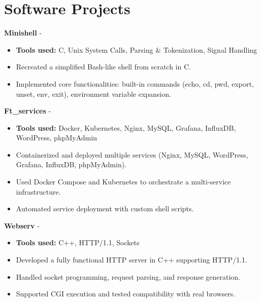 \documentclass[a4paper,11pt]{article}%
\begin{document}
\section*{Software Projects}%
%
\noindent \textbf{Minishell} - \href{https://github.com/sboof911/minishell}{{}}%
\begin{itemize}[leftmargin=2em,label={},parsep=0pt,topsep=1em]%
\item \textbf{Tools used:} C, Unix System Calls, Parsing \& Tokenization, Signal Handling%
\item Recreated a simplified Bash-like shell from scratch in C.%
\item Implemented core functionalities: built-in commands (echo, cd, pwd, export, unset, env, exit), environment variable expansion.%
\end{itemize}%
%
\noindent \textbf{Ft\_services} - \href{https://github.com/sboof911/ft_services}{{}}%
\begin{itemize}[leftmargin=2em,label={},parsep=0pt,topsep=1em]%
\item \textbf{Tools used:} Docker, Kubernetes, Nginx, MySQL, Grafana, InfluxDB, WordPress, phpMyAdmin%
\item Containerized and deployed multiple services (Nginx, MySQL, WordPress, Grafana, InfluxDB, phpMyAdmin).%
\item Used Docker Compose and Kubernetes to orchestrate a multi-service infrastructure.%
\item Automated service deployment with custom shell scripts.%
\end{itemize}%
%
\noindent \textbf{Webserv} - \href{https://github.com/sboof911/webserv}{{}}%
\begin{itemize}[leftmargin=2em,label={},parsep=0pt,topsep=1em]%
\item \textbf{Tools used:} C++, HTTP/1.1, Sockets%
\item Developed a fully functional HTTP server in C++ supporting HTTP/1.1.%
\item Handled socket programming, request parsing, and response generation.%
\item Supported CGI execution and tested compatibility with real browsers.%
\end{itemize}%
\end{document}
